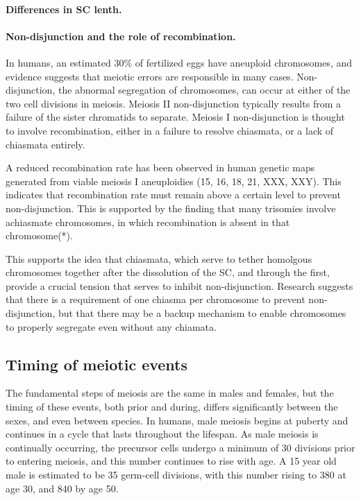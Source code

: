 \paragraph{Differences in SC lenth.}


\paragraph{Non-disjunction and the role of recombination.}
In humans, an estimated 30\% of fertilized eggs have aneuploid chromosomes\cite{Hassold2001}, and evidence suggests that meiotic errors are responsible in many cases.
Non-disjunction, the abnormal segregation of chromosomes, can occur at either of the two cell divisions in meiosis.
Meiosis II non-disjunction typically results from a failure of the sister chromatids to separate.
Meiosis I non-disjunction is thought to involve recombination, either in a failure to resolve chiasmata, or a lack of chiasmata entirely.

A reduced recombination rate has been observed in human genetic maps generated from viable meiosis I aneuploidies (15, 16, 18, 21, XXX, XXY)\cite{Hassold2001,Lynn2004}.
This indicates that recombination rate must remain above a certain level to prevent non-disjunction.
This is supported by the finding that many trisomies involve achiasmate chromosomes, in which recombination is absent in that chromosome(*).

This supports the idea that chiasmata, which serve to tether homolgous chromosomes together after the dissolution of the SC, and through the first, provide a crucial tension that serves to inhibit non-disjunction.
Research suggests that there is a requirement of one chiasma per chromosome to prevent non-disjunction, but that there may be a backup mechanism to enable chromosomes to properly segregate even without any chiamata\cite{Fledel-Alon2009}.



\subsection{Timing of meiotic events}

The fundamental steps of meiosis are the same in males and females, but the timing of these events, both prior and during, differs significantly between the sexes\cite{Lynn2004}, and even between species.
In humans, male meiosis begins at puberty and continues in a cycle that lasts throughout the lifespan.
As male meiosis is continually occurring, the precursor cells undergo a minimum of 30 divisions prior to entering meiosis, and this number continues to rise with age.
A 15 year old male is estimated to be 35 germ-cell divisions, with this number rising to 380 at age 30, and 840 by age 50\cite{Crow2000a}.

